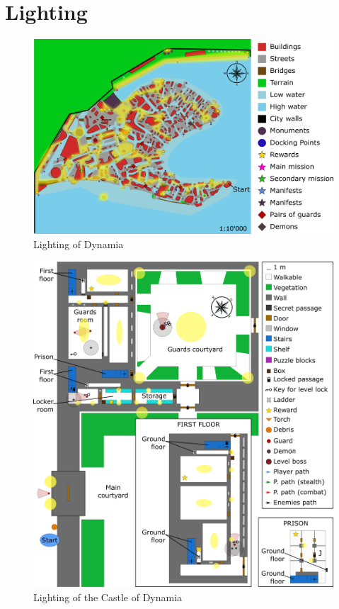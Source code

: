 \section{Lighting}

\begin{figure}[H]
  \centering
  \includegraphics[width=\textwidth]{Images/Maps/dynamiaLighting}
  \caption{Lighting of Dynamia}
\end{figure}

\begin{figure}[H]
  \centering
  \includegraphics[width=\textwidth]{Images/Maps/castleOfDynamiaLighting}
  \caption{Lighting of the Castle of Dynamia}
\end{figure}

